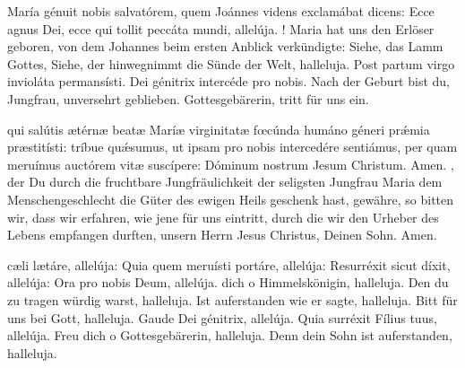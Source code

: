 \documentclass[fontsize=10pt,paper=A5,twoside,BCOR=1mm,DIV=21,headinclude]{scrarticle}
\begin{document}

\vspace{.3em}

\begin{paracol}{2}\pcb
{} María génuit nobis salvatórem, quem Joánnes videns exclamábat dicens: Ecce agnus Dei, ecce qui tollit peccáta mundi, allelúja.
	\switchcolumn
	! Maria hat uns den Erlöser geboren, von dem Johannes beim ersten Anblick verkündigte: Siehe, das Lamm Gottes, Siehe, der hinwegnimmt die Sünde der Welt, halleluja.
\switchcolumn*
\V Post partum virgo invioláta permansísti.
\R Dei génitrix intercéde pro nobis.
	\switchcolumn
	\V Nach der Geburt bist du, Jungfrau, unversehrt geblieben.
	\R Gottesgebärerin, tritt für uns ein.
\end{paracol}


\vspace{.3em}

\begin{paracol}{2}\pcb
	 qui salútis ætérnæ beatæ Maríæ virginitatæ fœcúnda humáno géneri pr\'æmia præstitísti: tríbue qu\'æsumus, ut ipsam pro nobis intercedére sentiámus, per quam meruímus auctórem vitæ suscípere: Dóminum nostrum Jesum Christum. \R Amen.
	\switchcolumn
	, der Du durch die fruchtbare Jungfräulichkeit der seligsten Jungfrau Maria dem Menschengeschlecht die Güter des ewigen Heils geschenk hast, gewähre, so bitten wir, dass wir erfahren, wie jene für uns eintritt, durch die wir den Urheber des Lebens empfangen durften, unsern Herrn Jesus Christus, Deinen Sohn. \R Amen.
\end{paracol}


\vspace{.3em}

\begin{paracol}{2}\pcb
{} cæli lætáre, allelúja: Quia quem meruísti portáre, allelúja: Resurréxit sicut díxit, allelúja: Ora pro nobis Deum, allelúja.
	\switchcolumn
	 dich o Himmelskönigin, halleluja. Den du zu tragen würdig warst, halleluja. Ist auferstanden wie er sagte, halleluja. Bitt für uns bei Gott, halleluja.
\switchcolumn*
\V Gaude Dei génitrix, allelúja.
\R Quia surréxit Fílius tuus, allelúja.
	\switchcolumn
	\V Freu dich o Gottesgebärerin, halleluja.
	\R Denn dein Sohn ist auferstanden, halleluja.
\end{paracol}
\end{document}
